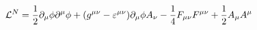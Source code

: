 \begin{equation}
{\cal{L}}^N = \frac{1}{2} \partial_\mu \phi \partial^\mu
  \phi + (g^{\mu\nu} - \varepsilon^{\mu\nu}) \partial_\mu\phi
  A_\nu - \frac{1}{4} F_{\mu\nu} F^{\mu\nu} + \frac{1}{2} A_\mu
  A^\mu
 \label{a60}
 \end{equation}

